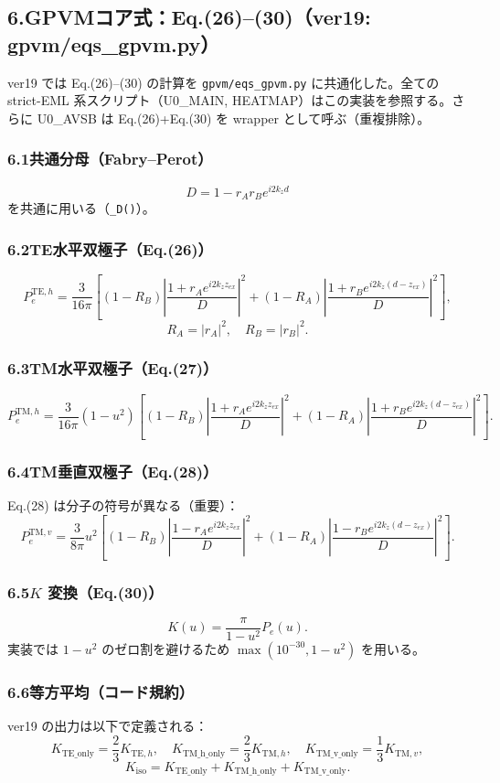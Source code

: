\documentclass[a4paper,11pt]{jsarticle} %
\begin{document}
\subsection*{6.\;GPVMコア式：Eq.(26)--(30)（ver19: gpvm/eqs\_gpvm.py）}
ver19 では Eq.(26)--(30) の計算を \texttt{gpvm/eqs\_gpvm.py} に共通化した。全ての strict-EML 系スクリプト（U0\_MAIN, HEATMAP）はこの実装を参照する。さらに U0\_AVSB は Eq.(26)+Eq.(30) を wrapper として呼ぶ（重複排除）。

\subsubsection*{6.1\;共通分母（Fabry--Perot）}
\[
D = 1-r_A r_B e^{i2k_z d}
\]
を共通に用いる（\texttt{\_D()}）。

\subsubsection*{6.2\;TE水平双極子（Eq.(26)）}
\[
P_e^{\mathrm{TE},h}
=
\frac{3}{16\pi}\left[
(1-R_B)\left|\frac{1+r_A e^{i2k_z z_{ex}}}{D}\right|^2
+
(1-R_A)\left|\frac{1+r_B e^{i2k_z (d-z_{ex})}}{D}\right|^2
\right],
\]
\[
R_A=|r_A|^2,\quad R_B=|r_B|^2.
\]

\subsubsection*{6.3\;TM水平双極子（Eq.(27)）}
\[
P_e^{\mathrm{TM},h}
=
\frac{3}{16\pi}(1-u^2)\left[
(1-R_B)\left|\frac{1+r_A e^{i2k_z z_{ex}}}{D}\right|^2
+
(1-R_A)\left|\frac{1+r_B e^{i2k_z (d-z_{ex})}}{D}\right|^2
\right].
\]

\subsubsection*{6.4\;TM垂直双極子（Eq.(28)）}
Eq.(28) は分子の符号が異なる（重要）：
\[
P_e^{\mathrm{TM},v}
=
\frac{3}{8\pi}u^2\left[
(1-R_B)\left|\frac{1-r_A e^{i2k_z z_{ex}}}{D}\right|^2
+
(1-R_A)\left|\frac{1-r_B e^{i2k_z (d-z_{ex})}}{D}\right|^2
\right].
\]

\subsubsection*{6.5\;$K$ 変換（Eq.(30)）}
\[
K(u)=\frac{\pi}{1-u^2}P_e(u).
\]
実装では $1-u^2$ のゼロ割を避けるため $\max(10^{-30},1-u^2)$ を用いる。

\subsubsection*{6.6\;等方平均（コード規約）}
ver19 の出力は以下で定義される：
\[
K_{\mathrm{TE\_only}}=\frac{2}{3}K_{\mathrm{TE},h},\quad
K_{\mathrm{TM\_h\_only}}=\frac{2}{3}K_{\mathrm{TM},h},\quad
K_{\mathrm{TM\_v\_only}}=\frac{1}{3}K_{\mathrm{TM},v},
\]
\[
K_{\mathrm{iso}}=K_{\mathrm{TE\_only}}+K_{\mathrm{TM\_h\_only}}+K_{\mathrm{TM\_v\_only}}.
\]
\end{document}
